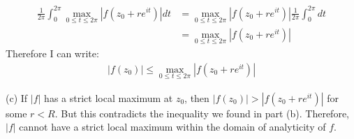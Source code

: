 \begin{example}
\begin{align*}
        \frac{1}{2\pi} \int_{0}^{2\pi} \max_{0\leq t\leq2\pi}|f(z_0+re^{it})| dt & =\max_{0\leq t\leq2\pi}|f(z_0+re^{it})| \frac{1}{2\pi}  \int_{0}^{2\pi} dt    \\
                                                                                 & = \max_{0\leq t\leq2\pi}|f(z_0+re^{it})|
    \end{align*}
    Therefore I can write:
    \begin{align*}
        |f(z_0)|\leq\max_{0\leq t\leq2\pi}|f(z_0+re^{it})|
    \end{align*}

    (c) If $|f|$ has a strict local maximum at $z_0$, then $|f(z_0)| > |f(z_0 + re^{it})|$ for some $r<R$. But this contradicts the inequality we found in part (b). Therefore, $|f|$ cannot have a strict local maximum within the domain of analyticity of $f$.
\end{example}